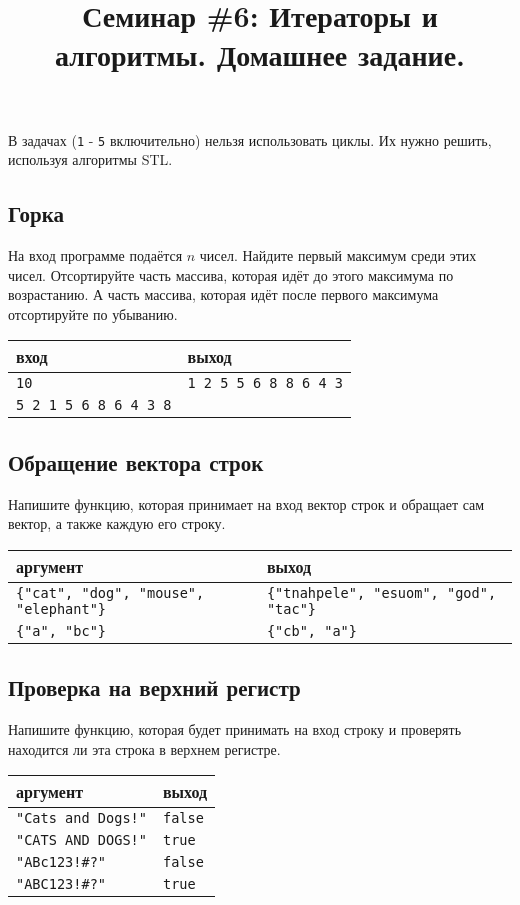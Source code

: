 \documentclass{article}
\begin{document}
\title{Семинар \#6: Итераторы и алгоритмы. Домашнее задание.\vspace{-5ex}}\date{}\maketitle
В задачах (\texttt{1} - \texttt{5} включительно) нельзя использовать циклы. Их нужно решить, используя алгоритмы STL.
\subsection{Горка}
На вход программе подаётся $n$ чисел. Найдите первый максимум среди этих чисел. Отсортируйте часть массива, которая идёт до этого максимума по возрастанию. А часть массива, которая идёт после первого максимума отсортируйте по убыванию.
\begin{center}
\begin{tabular}{ l | l }
 вход & выход \\ \hline
 \texttt{10} & \texttt{1 2 5 5 6 8 8 6 4 3} \\
 \texttt{5 2 1 5 6 8 6 4 3 8} &
\end{tabular}
\end{center}


\subsection{Обращение вектора строк}
Напишите функцию, которая принимает на вход вектор строк и обращает сам вектор, а также каждую его строку.
\begin{center}
\begin{tabular}{ l | l }
 аргумент & выход \\ \hline
 \texttt{\{"cat"{}, "dog"{}, "mouse"{}, "elephant"\}} & \texttt{\{"tnahpele"{}, "esuom"{}, "god"{}, "tac"\}} \\
 \texttt{\{"a"{}, "bc"\}} & \texttt{\{"cb"{}, "a"\}} \\
\end{tabular}
\end{center}

\subsection{Проверка на верхний регистр}
Напишите функцию, которая будет принимать на вход строку и проверять находится ли эта строка в верхнем регистре.
\begin{center}
\begin{tabular}{ l | l }
 аргумент & выход \\ \hline
 \texttt{"Cats and Dogs!"} & \texttt{false} \\
 \texttt{"CATS AND DOGS!"} & \texttt{true} \\
 \texttt{"ABc123!\#?"} & \texttt{false} \\
 \texttt{"ABC123!\#?"} & \texttt{true}
\end{tabular}
\end{center}
\end{document}
